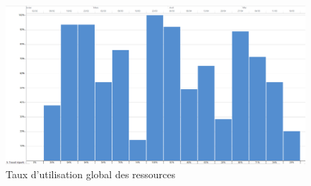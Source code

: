 		\begin{landscape}
		 	\begin{figure}
	            \centering
	            \includegraphics[height=0.70\textwidth]{figure/TauxUtilisation.png}
	            \caption{Taux d'utilisation global des ressources}
	            \label{fig:taux_utilisation}
	        \end{figure}
	    \end{landscape}